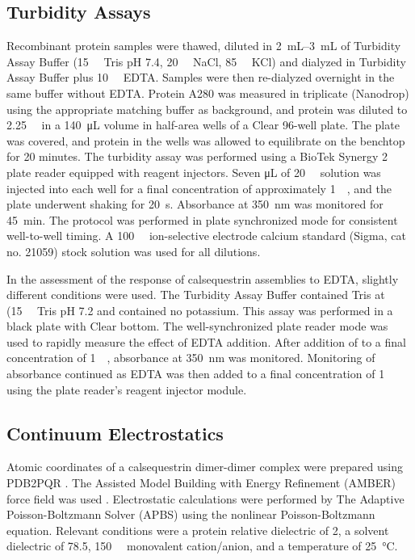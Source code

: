 \subsection*{Turbidity Assays}
Recombinant protein samples were thawed, diluted in \SIrange{2}{3}{\milli\liter} of Turbidity Assay Buffer (\SI{15}{\milli\Molar} Tris pH 7.4, \SI{20}{\milli\Molar} NaCl, \SI{85}{\milli\Molar} KCl) and dialyzed in Turbidity Assay Buffer plus \SI{10}{\milli\Molar} EDTA. Samples were then re-dialyzed overnight in the same buffer without EDTA. Protein A280 was measured in triplicate (Nanodrop) using the appropriate matching buffer as background, and protein was diluted to \SI{2.25}{\micro\Molar} in a \SI{140}{\micro\liter} volume in half-area wells of a \textmu Clear 96-well plate. The plate was covered, and protein in the wells was allowed to equilibrate on the benchtop for 20 minutes. The turbidity assay was performed using a BioTek Synergy 2 plate reader equipped with reagent injectors. Seven \si{\micro\liter} of \SI{20}{\milli\Molar}  solution was injected into each well for a final concentration of approximately \SI{1}{\milli\Molar}, and the plate underwent shaking for \SI{20}{\second}. Absorbance at \SI{350}{\nm} was monitored for \SI{45}{\minute}. The protocol was performed in plate synchronized mode for consistent well-to-well timing. A \SI{100}{\milli\Molar} ion-selective electrode calcium standard (Sigma, cat no. 21059) stock solution was used for all  dilutions.

\begin{hlbreakable}
In the assessment of the response of calsequestrin assemblies to EDTA, slightly different conditions were used. The Turbidity Assay Buffer contained Tris at (\SI{15}{\milli\Molar} Tris pH 7.2 and contained no potassium. This assay was performed in a black plate with \textmu Clear bottom. The well-synchronized plate reader mode was used to rapidly measure the effect of EDTA addition. After addition of  to a final concentration of \SI{1}{\milli\Molar}, absorbance at \SI{350}{\nm} was monitored. Monitoring of absorbance continued as EDTA was then added to a final concentration of \SI{1}{\milli\Molar} using the plate reader's reagent injector module.

\subsection*{Continuum Electrostatics}
Atomic coordinates of a calsequestrin dimer-dimer complex were prepared using PDB2PQR \cite{Dolinsky2004-oa}. The Assisted Model Building with Energy Refinement (AMBER) force field was used \cite{Cornell1995-ky}. Electrostatic calculations were performed by The Adaptive Poisson-Boltzmann Solver (APBS) \cite{Jurrus2018-gc} using the nonlinear Poisson-Boltzmann equation. Relevant conditions were a protein relative dielectric of 2, a solvent dielectric of 78.5, \SI{150}{\milli\Molar} monovalent cation/anion, and a temperature of \SI{25}{\degreeCelsius}.
\end{hlbreakable}

